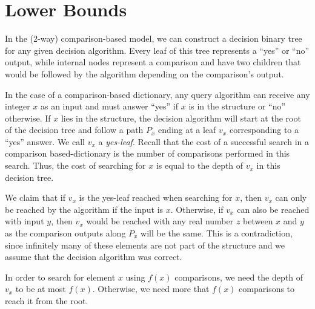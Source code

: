 \documentclass[11pt]{article}       %
\begin{document}
\section{Lower Bounds}\label{section:Lower Bounds}
In the (2-way) comparison-based model, we can construct a decision binary tree for any given decision algorithm. 
Every leaf of this tree represents a ``yes'' or ``no'' output, while internal nodes represent a comparison and have two children that would be followed by the algorithm depending on the comparison's output. 

In the case of a comparison-based dictionary, any query algorithm can receive any integer $x$ as an input and must answer ``yes'' if $x$ is in the structure or ``no'' otherwise. 
If $x$ lies in the structure, the decision algorithm will start at the root of the decision tree and follow a path $P_x$ ending at a leaf $v_x$ corresponding to a ``yes'' answer. We call $v_x$ a \emph{yes-leaf}. 
Recall that the cost of a successful search in a comparison based-dictionary is the number of comparisons performed in this search. Thus, the cost of searching for $x$ is equal to the depth of $v_x$ in this decision tree.

We claim that if $v_x$ is the yes-leaf reached when searching for $x$, then $v_x$ can only be reached by the algorithm if the input is $x$. Otherwise, if $v_x$ can also be reached with input $y$, then $v_x$ would be reached with any real number $z$ between $x$ and $y$ as the comparison outputs along $P_x$ will be the same. This is a contradiction, since infinitely many of these elements are not part of the structure and we assume that the decision algorithm was correct.

In order to search for element $x$ using $f(x)$ comparisons, we need the depth of $v_x$ to be at most $f(x)$. Otherwise, we need more that $f(x)$ comparisons to reach it from the root.
\end{document}
